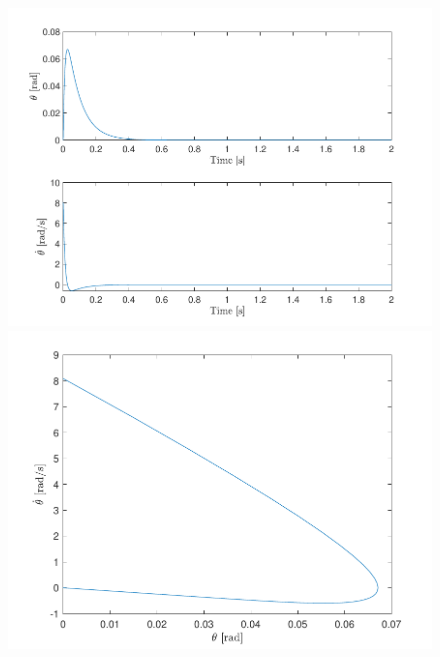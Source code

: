 \documentclass[10pt]{article}
\begin{document}
\begin{figure}[ht]
    \centering
    \begin{minipage}[b]{0.45\textwidth}
        \centering
        \includegraphics[clip,width=1\linewidth]{lab1/figs/section7_controlled_state_evolution_x_0_1.pdf}
    \end{minipage}
    \begin{minipage}[b]{0.45\textwidth}
        \centering
        \includegraphics[clip,width=1\linewidth]{lab1/figs/section7_controlled_state_orbit_x_0_1.pdf}
    \end{minipage}
\end{figure}
\end{document}
